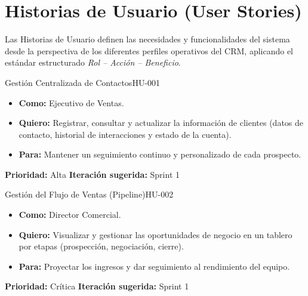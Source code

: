 \section{Historias de Usuario (User Stories)}

Las Historias de Usuario definen las necesidades y funcionalidades del sistema desde la perspectiva de los diferentes perfiles operativos del CRM, aplicando el estándar estructurado \textit{Rol -- Acción -- Beneficio}.

\begin{UserStoryBox}{Gestión Centralizada de Contactos}{HU-001}
    \sffamily
    \begin{itemize}[label=\textcolor{SecondarySteel}{\textbullet}]
        \item \textbf{Como:} Ejecutivo de Ventas.
        \item \textbf{Quiero:} Registrar, consultar y actualizar la información de clientes (datos de contacto, historial de interacciones y estado de la cuenta).
        \item \textbf{Para:} Mantener un seguimiento continuo y personalizado de cada prospecto.
    \end{itemize}
    \tcblower
    \small\textcolor{MutedText}{\textbf{Prioridad:} Alta \hfill \textbf{Iteración sugerida:} Sprint 1}
\end{UserStoryBox}

\begin{UserStoryBox}{Gestión del Flujo de Ventas (Pipeline)}{HU-002}
    \sffamily
    \begin{itemize}[label=\textcolor{SecondarySteel}{\textbullet}]
        \item \textbf{Como:} Director Comercial.
        \item \textbf{Quiero:} Visualizar y gestionar las oportunidades de negocio en un tablero por etapas (prospección, negociación, cierre).
        \item \textbf{Para:} Proyectar los ingresos y dar seguimiento al rendimiento del equipo.
    \end{itemize}
    \tcblower
    \small\textcolor{MutedText}{\textbf{Prioridad:} Crítica \hfill \textbf{Iteración sugerida:} Sprint 1}
\end{UserStoryBox}

